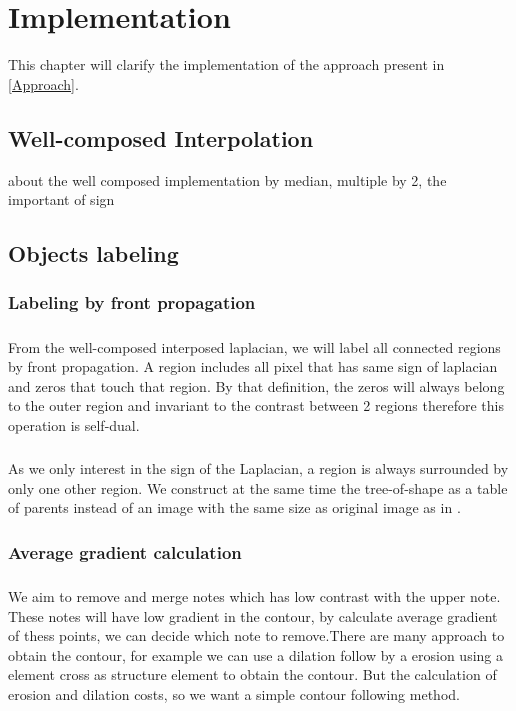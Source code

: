 
\graphicspath{ {5chapterImplementation/image/} }
\chapter{Implementation}

This chapter will clarify the implementation of the approach present in \autoref{Approach}.

\section{Well-composed Interpolation}

about the well composed implementation by median, multiple by 2, the important of sign

\section{Objects labeling}

\subsection{Labeling by front propagation}
\paragraph{} From the well-composed interposed laplacian, we will label all connected regions by front propagation. A region includes all pixel that has same sign of laplacian and zeros that touch that region. By that definition, the zeros will always belong to the outer region and invariant to the contrast between 2 regions therefore this operation is self-dual. 
\paragraph{}As we only interest in the sign of the Laplacian, a region is always surrounded by only one other region. We construct at the same time the tree-of-shape as a table of parents instead of an image with the same size as original image as in \cite{geraud.13.ismm}. 

\subsection{Average gradient calculation}
\paragraph{} We aim to remove and merge notes which has low contrast with the upper note. These notes will have low gradient in the contour, by calculate average gradient of thess points, we can decide which note to remove.There are many approach to obtain the contour, for example we can use a dilation follow by a erosion using a element cross as structure element to obtain the contour. But the calculation of erosion and dilation costs, so we want a simple contour following method. 
